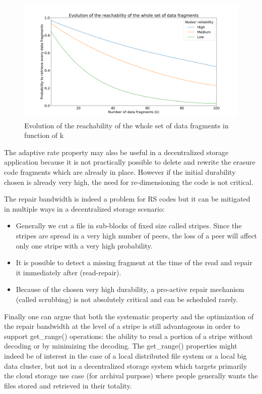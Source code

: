 \documentclass[oneside,9pt]{article}
\begin{document}
\begin{figure}[!h]
\centering
\includegraphics[width=0.7\columnwidth]{systematic.png}
\caption{Evolution of the reachability of the whole set of data fragments in function of k}
\label{fig:systematic}
\end{figure}

The adaptive rate property may also be useful in a decentralized storage application because it is not practically possible to delete and rewrite the erasure code fragments which are already in place. However if the initial durability chosen is already very high, the need for re-dimensioning the code is not critical.

The repair bandwidth is indeed a problem for RS codes but it can be mitigated in multiple ways in a decentralized storage scenario:
\begin{itemize}
\item Generally we cut a file in sub-blocks of fixed size called stripes. Since the stripes are spread in a very high number of peers, the loss of a peer will affect only one stripe with a very high probability.
\item It is possible to detect a missing fragment at the time of the read and repair it immediately after (read-repair).
\item Because of the chosen very high durability, a pro-active repair mechanism (called scrubbing) is not absolutely critical and can be scheduled rarely. 
\end{itemize}

Finally one can argue that both the systematic property and the optimization of the repair bandwidth at the level of a stripe is still advantageous in order to support get\_range() operations: the ability to read a portion of a stripe without decoding or by minimizing the decoding. The get\_range() properties might indeed be of interest in the case of a local distributed file system or a local big data cluster, but not in a decentralized storage system which targets primarily the cloud storage use case (for archival purpose) where people generally wants the files stored and retrieved in their totality.
\end{document}
